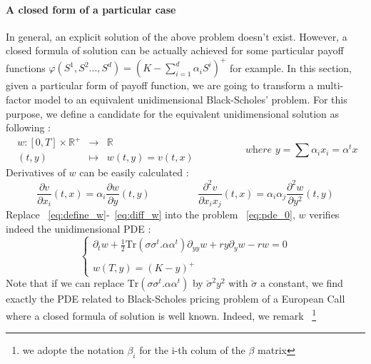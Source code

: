 \documentclass[a4paper,10pt]{article}
\begin{document}
\paragraph{A closed form of a particular case} \label{closed form}
In general, an explicit solution of the above problem doesn't exist. However, a closed formula of solution can be actually achieved  for some particular payoff functions $\varphi(S^1,S^2...,S^d) = ( K - \sum_{i=1}^d \alpha_i S^i  )^+$ for example. 
In this section, given a particular form of payoff function, we are going to transform a multi-factor model to an equivalent unidimensional Black-Scholes' problem. For this purpose, we define a candidate for the equivalent unidimensional solution as following :
\begin{equation}\label{eq:define_w}
\begin{array}{rcl}
w : [0,T]\times \mathbb{R}^+ &\longrightarrow& \mathbb{R} \\
                       (t,y) &\longmapsto& w(t,y)=v(t,x) 
\end{array}
\hspace{2cm}
\textit{where } y = \sum \alpha_i x_i = \alpha^{t} x   
\end{equation}
Derivatives of $w$ can be easily calculated : 
\begin{equation}\label{eq:diff_w}
\frac{\partial v}{\partial x_i}(t,x) = \alpha_i \frac{\partial w}{\partial y} (t,y)
\hspace{2cm}
\frac{\partial^2 v}{\partial x_ix_j}(t,x) = \alpha_i\alpha_j \frac{\partial^2 w}{\partial y^2} (t,y)
\end{equation}
Replace ~\eqref{eq:define_w}-~\eqref{eq:diff_w} into the problem ~\eqref{eq:pde_0}, $w$ verifies indeed the unidimensional PDE :
\begin{equation}\label{eq:pde_w}
\left\{
\begin{array}{ll}
\partial_t w +\frac{1}{2} \text{Tr}(\sigma \sigma^{t}.\alpha\alpha^{t}) \partial_{yy} w  +  r y \partial_{y} w - r w =0 \\ \\
w(T,y) = (K-y)^+
\end{array}
\right.
\end{equation}
Note that if we can replace $\text{Tr}(\sigma \sigma^{t}.\alpha\alpha^{t})$ by $\check{\sigma}^2y^2$ with $\check{\sigma}$ a constant, we find exactly the PDE related to Black-Scholes pricing problem of a European Call where a closed formula of solution is well known. Indeed, we remark ~\footnote{we adopte the notation $\beta_i$ for the i-th colum of the $\beta$ matrix}
\end{document}
